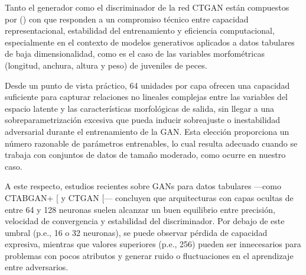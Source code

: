\documentclass[a4paper,10pt,spanish]{jupyterBook}
\begin{document}
\sphinxAtStartPar
Tanto el generador como el discriminador de la red CTGAN están compuestos por  () con  que responden a un compromiso técnico entre capacidad representacional, estabilidad del entrenamiento y eficiencia computacional, especialmente en el contexto de modelos generativos aplicados a datos tabulares de baja dimensionalidad, como es el caso de las variables morfométricas (longitud, anchura, altura y peso) de juveniles de peces.

\sphinxAtStartPar
Desde un punto de vista práctico, 64 unidades por capa ofrecen una capacidad suficiente para capturar relaciones no lineales complejas entre las variables del espacio latente y las características morfológicas de salida, sin llegar a una sobreparametrización excesiva que pueda inducir sobreajuste o inestabilidad adversarial durante el entrenamiento de la GAN. Esta elección proporciona un número razonable de parámetros entrenables, lo cual resulta adecuado cuando se trabaja con conjuntos de datos de tamaño moderado, como ocurre en nuestro caso.

\sphinxAtStartPar
A este respecto, estudios recientes sobre GANs para datos tabulares —como CTAB\sphinxhyphen{}GAN+ {[}\sphinxhref{https://doi.org/10.3389/fdata.2023.1296508}{Zao et al., 2024}{]} y CTGAN {[}\sphinxhref{https://doi.org/10.1007/s00778-023-00807-y}{Liu et al., 2023}{]}— concluyen que arquitecturas con capas ocultas de entre 64 y 128 neuronas suelen alcanzar un buen equilibrio entre precisión, velocidad de convergencia y estabilidad del discriminador. Por debajo de este umbral (p.e., 16 o 32 neuronas), se puede observar pérdida de capacidad expresiva, mientras que valores superiores (p.e., 256) pueden ser innecesarios para problemas con pocos atributos y generar ruido o fluctuaciones en el aprendizaje entre adversarios.
\end{document}
